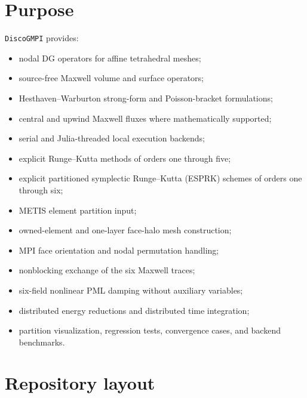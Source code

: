 \documentclass[11pt,oneside]{book}
\newcommand{\pkg}{\texttt{DiscoGMPI}}
\begin{document}
\section{Purpose}

\pkg{} provides:

\begin{itemize}[leftmargin=*]
  \item nodal DG operators for affine tetrahedral meshes;
  \item source-free Maxwell volume and surface operators;
  \item Hesthaven--Warburton strong-form and Poisson-bracket formulations;
  \item central and upwind Maxwell fluxes where mathematically supported;
  \item serial and Julia-threaded local execution backends;
  \item explicit Runge--Kutta methods of orders one through five;
  \item explicit partitioned symplectic Runge--Kutta (ESPRK) schemes of
        orders one through six;
  \item METIS element partition input;
  \item owned-element and one-layer face-halo mesh construction;
  \item MPI face orientation and nodal permutation handling;
  \item nonblocking exchange of the six Maxwell traces;
  \item six-field nonlinear PML damping without auxiliary variables;
  \item distributed energy reductions and distributed time integration;
  \item partition visualization, regression tests, convergence cases, and
        backend benchmarks.
\end{itemize}

\section{Repository layout}
\end{document}
